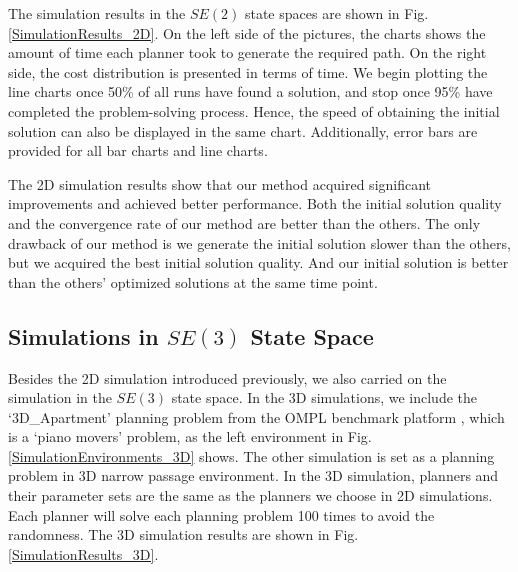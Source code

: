 The simulation results in the $SE(2)$ state spaces are shown in Fig. \ref{SimulationResults_2D}.
On the left side of the pictures, the charts shows the amount of time each planner took to generate the required path.
On the right side, the cost distribution is presented in terms of time. We begin plotting the line charts once 50\% of all runs have found a solution, and stop once 95\% have completed the problem-solving process. 
Hence, the speed of obtaining the initial solution can also be displayed in the same chart.
Additionally, error bars are provided for all bar charts and line charts.


The 2D simulation results show that our method acquired significant improvements and achieved better performance.
Both the initial solution quality and the convergence rate of our method are better than the others.
The only drawback of our method is we generate the initial solution slower than the others, but we acquired the best initial solution quality.
And our initial solution is better than the others' optimized solutions at the same time point.


\subsection{Simulations in $SE(3)$ State Space}



Besides the 2D simulation introduced previously, we also carried on the simulation in the $SE(3)$ state space. 
In the 3D simulations, we include the `3D\_Apartment' planning problem from the OMPL benchmark platform \cite{moll2015benchmarking}, which is a `piano movers' problem, as the left environment in Fig. \ref{SimulationEnvironments_3D} shows.
The other simulation is set as a planning problem in 3D narrow passage environment.
In the 3D simulation, planners and their parameter sets are the same as the planners we choose in 2D simulations.
Each planner will solve each planning problem 100 times to avoid the randomness.
The 3D simulation results are shown in Fig. \ref{SimulationResults_3D}.


